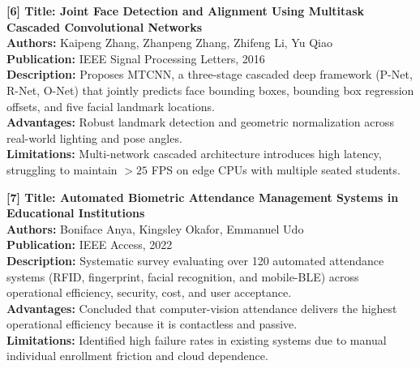 \vspace{0.15in}
\begin{flushleft}
{\fontsize{12pt}{14pt}\selectfont \textbf{[6] Title: Joint Face Detection and Alignment Using Multitask Cascaded Convolutional Networks}} \\
\textbf{Authors:} Kaipeng Zhang, Zhanpeng Zhang, Zhifeng Li, Yu Qiao \\
\textbf{Publication:} IEEE Signal Processing Letters, 2016 \\
\textbf{Description:} Proposes MTCNN, a three-stage cascaded deep framework (P-Net, R-Net, O-Net) that jointly predicts face bounding boxes, bounding box regression offsets, and five facial landmark locations. \\
\textbf{Advantages:} Robust landmark detection and geometric normalization across real-world lighting and pose angles. \\
\textbf{Limitations:} Multi-network cascaded architecture introduces high latency, struggling to maintain $>25$ FPS on edge CPUs with multiple seated students.
\end{flushleft}

\vspace{0.15in}
\begin{flushleft}
{\fontsize{12pt}{14pt}\selectfont \textbf{[7] Title: Automated Biometric Attendance Management Systems in Educational Institutions}} \\
\textbf{Authors:} Boniface Anya, Kingsley Okafor, Emmanuel Udo \\
\textbf{Publication:} IEEE Access, 2022 \\
\textbf{Description:} Systematic survey evaluating over 120 automated attendance systems (RFID, fingerprint, facial recognition, and mobile-BLE) across operational efficiency, security, cost, and user acceptance. \\
\textbf{Advantages:} Concluded that computer-vision attendance delivers the highest operational efficiency because it is contactless and passive. \\
\textbf{Limitations:} Identified high failure rates in existing systems due to manual individual enrollment friction and cloud dependence.
\end{flushleft}

